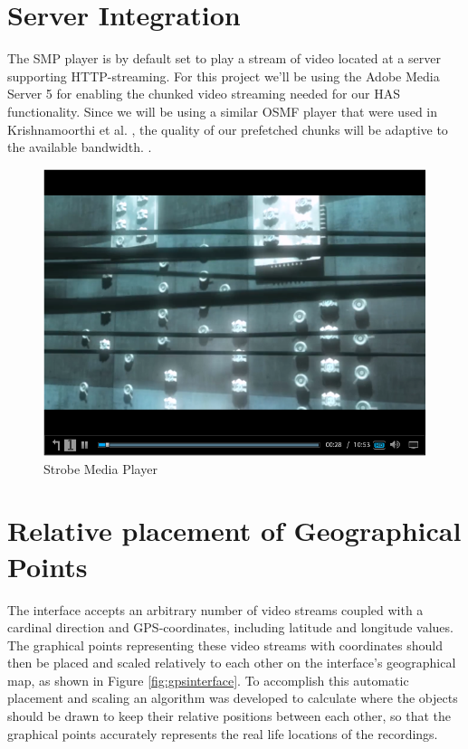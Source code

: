 \section{Server Integration}
\label{sec:serverintegration}

The SMP player is by default set to play a stream of video located at a server supporting HTTP-streaming. For this project we'll be using the Adobe Media Server 5 for enabling the chunked video streaming needed for our HAS functionality. Since we will be using a similar OSMF player that were used in Krishnamoorthi et al. \cite{hasmultipath}, the quality of our prefetched chunks will be adaptive to the available bandwidth. \cite{hasmultipath}.

\begin{figure}[t!]
\begin{center}
	\includegraphics[scale=0.7]{Media_player.png}
	\caption{Strobe Media Player}
	\label{fig:mediaplayer}
\end{center}
\end{figure}

\section{Relative placement of Geographical Points}
\label{sec:relativeplacement}

The interface accepts an arbitrary number of video streams coupled with a cardinal direction and GPS-coordinates, including latitude and longitude values. The graphical points representing these video streams with coordinates should then be placed and scaled relatively to each other on the interface's geographical map, as shown in Figure \ref{fig:gpsinterface}. To accomplish this automatic placement and scaling an algorithm was developed to calculate where the objects should be drawn to keep their relative positions between each other, so that the graphical points accurately represents the real life locations of the recordings.


